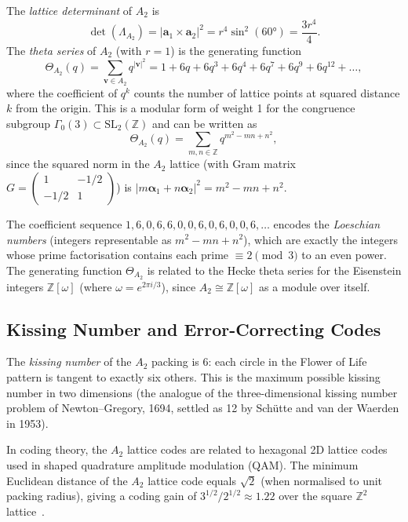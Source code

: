 The \emph{lattice determinant} of \(A_2\) is
\[
  \det(\Lambda_{A_2}) = |\mathbf{a}_1\times\mathbf{a}_2|^2 = r^4\sin^2(60°) = \frac{3r^4}{4}.
\]
The \emph{theta series} of \(A_2\) (with \(r=1\)) is the generating function
\[
  \Theta_{A_2}(q) = \sum_{\mathbf{v}\in A_2} q^{|\mathbf{v}|^2}
  = 1 + 6q + 6q^3 + 6q^4 + 6q^7 + 6q^9 + 6q^{12} + \ldots,
\]
where the coefficient of \(q^k\) counts the number of lattice points at
squared distance \(k\) from the origin.  This is a modular form of weight 1
for the congruence subgroup \(\Gamma_0(3)\subset\mathrm{SL}_2(\mathbb{Z})\)
and can be written as
\[
  \Theta_{A_2}(q) = \sum_{m,n\in\mathbb{Z}} q^{m^2-mn+n^2},
\]
since the squared norm in the \(A_2\) lattice (with Gram matrix
\(G=\begin{pmatrix}1&-1/2\\-1/2&1\end{pmatrix}\)) is
\(|m\boldsymbol{\alpha}_1+n\boldsymbol{\alpha}_2|^2 = m^2-mn+n^2\).

The coefficient sequence \(1,6,0,6,6,0,0,6,0,6,0,0,6,\ldots\)
encodes the \emph{Loeschian numbers} (integers representable as
\(m^2-mn+n^2\)), which are exactly the integers whose prime factorisation
contains each prime \(\equiv 2\pmod{3}\) to an even power.  The
generating function \(\Theta_{A_2}\) is related to the Hecke theta series
for the Eisenstein integers \(\mathbb{Z}[\omega]\) (where
\(\omega=e^{2\pi i/3}\)), since \(A_2\cong\mathbb{Z}[\omega]\) as
a module over itself.

\subsection{Kissing Number and Error-Correcting Codes}
\label{subsec:fol-kissing}

The \emph{kissing number} of the \(A_2\) packing is 6: each circle in
the Flower of Life pattern is tangent to exactly six others.  This is
the maximum possible kissing number in two dimensions (the analogue of
the three-dimensional kissing number problem of Newton--Gregory, 1694,
settled as 12 by Schütte and van der Waerden in 1953).

In coding theory, the \(A_2\) lattice codes are related to hexagonal
2D lattice codes used in shaped quadrature amplitude modulation (QAM).
The minimum Euclidean distance of the \(A_2\) lattice code equals
\(\sqrt{2}\) (when normalised to unit packing radius), giving a
coding gain of \(3^{1/2}/2^{1/2}\approx 1.22\) over the square
\(\mathbb{Z}^2\) lattice~\cite{conway_sphere_packings}.

